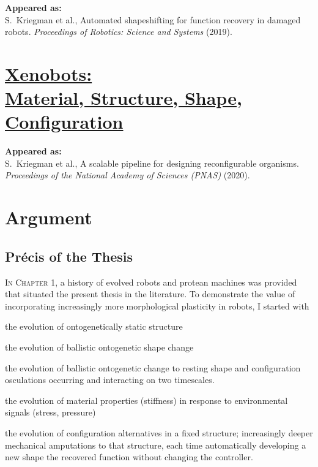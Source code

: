 \textbf{Appeared as:}\\
S.~Kriegman et al., Automated shapeshifting for function recovery in damaged robots. \textit{Proceedings of Robotics: Science and Systems} (2019).


\chapter[Xenobots: Material, Structure, Shape, Configuration]{\href{https://www.pnas.org/content/117/4/1853}{\color{blue}Xenobots: \\ {\LARGE Material, Structure, Shape, Configuration}}}

\textbf{Appeared as:}\\
S.~Kriegman et al., A scalable pipeline for designing reconfigurable organisms. 
\textit{Proceedings of the National Academy of Sciences (PNAS)} (2020).





\chapter{Argument}


\section{Pr\'{e}cis of the Thesis}

\textsc{In Chapter 1,}
a history of 
evolved robots 
and protean machines was provided
that situated the present thesis in the literature.
To demonstrate 
the value of incorporating increasingly more morphological plasticity in robots,
I started with

the evolution of ontogenetically static structure

the evolution of ballistic ontogenetic shape change

the evolution of ballistic ontogenetic change to resting shape and configuration osculations occurring and interacting on two timescales.

the evolution of material properties (stiffness) in response to environmental signals (stress, pressure)


the evolution of configuration alternatives in a fixed structure; increasingly deeper mechanical amputations to that structure, each time automatically developing a new shape the recovered function without changing the controller.

